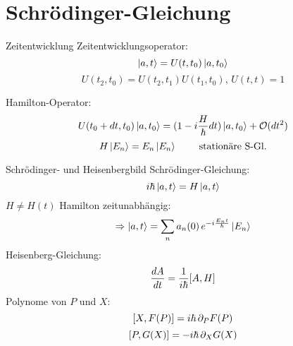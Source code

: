 \section{Schrödinger-Gleichung}

\begin{subbox}{Zeitentwicklung}
Zeitentwicklungsoperator:
\[ \ket{a, t} = U(t, t_0) \ket{a, t_0} \]
\[ U(t_2, t_0) = U(t_2, t_1) U(t_1, t_0), \, U(t,t) = 1 \]

Hamilton-Operator:
\[ U(t_0 + dt, t_0) \ket{a, t_0} = (1-i\frac{H}{\hbar} dt ) \ket{a, t_0} + \mathcal{O}(dt^2) \]
\[ H\ket{E_n} = E_n \ket{E_n} \hspace{.8cm} \text{stationäre S-Gl.}\] 
\end{subbox}

\begin{mainbox}{Schrödinger- und Heisenbergbild}
Schrödinger-Gleichung:
\[ i\hbar \ket{a,t} = H \ket{a,t}    \]
\( H \neq H(t) \) Hamilton zeitunabhängig:
\[ \Rightarrow \ket{a, t} = \sum_n a_n(0) \, e^{-i \frac{E_n t}{\hbar}} \ket{E_n} \]
Heisenberg-Gleichung:
\[ \frac{dA}{dt} = \frac{1}{i\hbar} \comm{A}{H} \]
Polynome von $P$ und $X$:
\[ \comm{X}{F(P)} = i\hbar\,\partial_P F(P) \]
\[ \comm{P}{G(X)} = -i\hbar\,\partial_X G(X) \]
\end{mainbox}